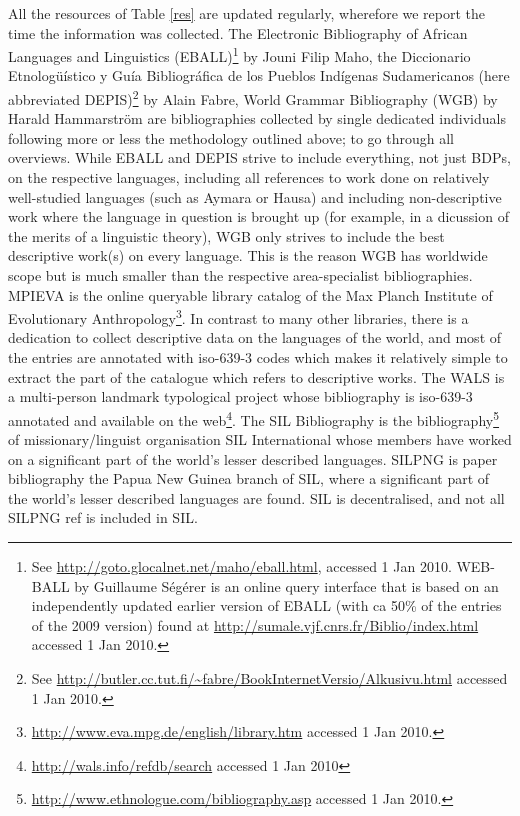 \documentclass[english,11pt,twoside]{article}
\begin{document}
All the resources of Table \ref{res} are updated regularly, wherefore
we report the time the information was collected.  The Electronic
Bibliography of African Languages and Linguistics (EBALL)\footnote{See
  \url{http://goto.glocalnet.net/maho/eball.html}, accessed 1 Jan
  2010. WEB-BALL by Guillaume S\'eg\'erer is an online query interface
  that is based on an independently updated earlier version of EBALL
  (with ca 50\% of the entries of the 2009 version) found at
  \url{http://sumale.vjf.cnrs.fr/Biblio/index.html} accessed 1 Jan
  2010.} by Jouni Filip Maho, the Diccionario Etnolog\"u\'istico y
Gu\'ia Bibliogr\'afica de los Pueblos Ind\'igenas Sudamericanos (here
abbreviated DEPIS)\footnote{See
  \url{http://butler.cc.tut.fi/~fabre/BookInternetVersio/Alkusivu.html}
  accessed 1 Jan 2010.} by Alain Fabre, World Grammar Bibliography
(WGB) by Harald Hammarstr\"om are bibliographies collected by single
dedicated individuals following more or less the methodology outlined
above; to go through all overviews. While EBALL and DEPIS strive to
include everything, not just BDPs, on the respective languages,
including all references to work done on relatively well-studied
languages (such as Aymara or Hausa) and including non-descriptive work
where the language in question is brought up (for example, in a
dicussion of the merits of a linguistic theory), WGB only strives to
include the best descriptive work(s) on every language. This is the
reason WGB has worldwide scope but is much smaller than the respective
area-specialist bibliographies. MPIEVA is the online queryable library
catalog of the Max Planch Institute of Evolutionary
Anthropology\footnote{\url{http://www.eva.mpg.de/english/library.htm}
  accessed 1 Jan 2010.}. In contrast to many other libraries, there is
a dedication to collect descriptive data on the languages of the
world, and most of the entries are annotated with iso-639-3 codes
which makes it relatively simple to extract the part of the catalogue
which refers to descriptive works. The WALS is a multi-person landmark
typological project whose bibliography is iso-639-3 annotated and
available on the web\footnote{\url{http://wals.info/refdb/search}
  accessed 1 Jan 2010}. The SIL Bibliography is the
bibliography\footnote{\url{http://www.ethnologue.com/bibliography.asp}
  accessed 1 Jan 2010.} of missionary/linguist organisation SIL
International whose members have worked on a significant part of the
world's lesser described languages. SILPNG is paper bibliography
\citep{hb:SILPNG:1956-1990,hb:SILPNG:1991-2000,hb:Feldpausch:2001-2003,hb:Feldpausch:2004}
the Papua New Guinea branch of SIL, where a significant part of the
world's lesser described languages are found.  SIL is decentralised,
and not all SILPNG ref is included in SIL.
\end{document}
